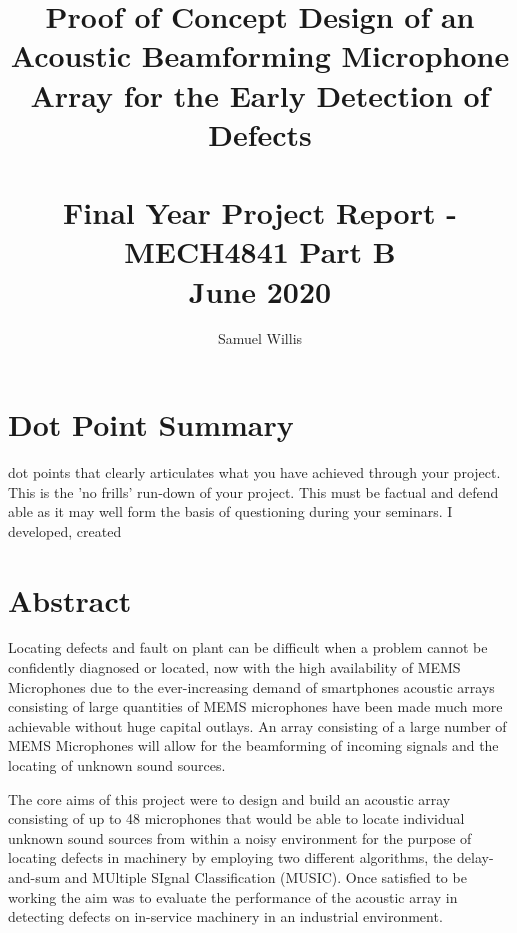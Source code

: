 \documentclass{UoNMCHA}
\numberwithin{equation}{section}
\begin{document}
\singlespacing
\title{Proof of Concept Design of an Acoustic Beamforming Microphone Array for the Early Detection of Defects \\ \ \\
{\small Final Year Project Report - MECH4841 Part B  \\June 2020}}
\author[UoNMCHA]{Samuel Willis}
\address[UoNMCHA]{
Student of Mechanical Engineering,\\
The University of Newcastle, Callaghan, NSW 2308, AUSTRALIA \\
Student Number: 3256767 \\
E-mail: \href{mailto:s.willis@uon.edu.au}{\textsf{s.willis@uon.edu.au}}}
\maketitle
\onecolumn
\newpage
\onehalfspacing
\section*{Dot Point Summary}
    dot points that clearly articulates what you have achieved through your project. This is the 'no frills' run‐down of your project. This must be factual and defend able as it may well form the basis of questioning during your seminars.
    I developed,  created
\newpage
\vspace{-5mm}
\section*{Abstract}
\vspace{-3mm}
    
    Locating defects and fault on plant can be difficult when a problem cannot be confidently diagnosed or located,
    now with the high availability of MEMS Microphones due to the ever-increasing demand of smartphones acoustic arrays consisting of large quantities of MEMS microphones have been made much more achievable without huge capital outlays. An array consisting of a large number of MEMS Microphones will allow for the beamforming of incoming signals and the locating of unknown sound sources. 
    
    The core aims of this project were to design and build an acoustic array consisting of up to 48 microphones that would be able to locate individual unknown sound sources from within a noisy environment for the purpose of locating defects in machinery by employing two different algorithms, the delay-and-sum and MUltiple SIgnal Classification (MUSIC). Once satisfied to be working the aim was to evaluate the performance of the acoustic array in detecting defects on in-service machinery in an industrial environment.
    
\end{document}
